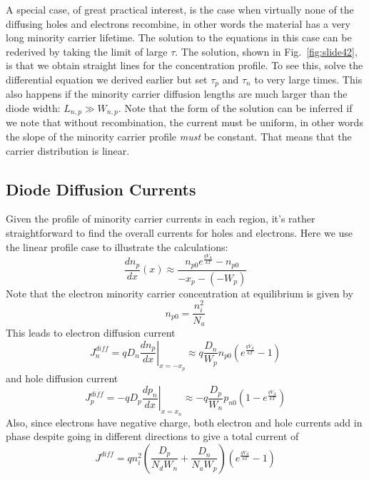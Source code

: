 A special case, of great practical interest, is the case when virtually none of the diffusing holes and electrons recombine, in other words the material has a very long minority carrier lifetime.  The solution to the equations in this case can be rederived by taking the limit of large $\tau$.  The solution, shown in Fig.~\ref{fig:slide42}, is that we obtain straight lines for the concentration profile.
To see this, solve the differential equation we derived earlier but set $\tau_p$ and $\tau_n$ to very large times.  This also happens if the minority carrier diffusion lengths are much larger than the diode width: $ {L_{n,p}} \gg {W_{n,p}} $.  Note that the form of the solution can be inferred if we note that without recombination, the current must be uniform, in other words the slope of the minority carrier profile \emph{must} be constant. That means that the carrier distribution is linear.
\subsection{Diode Diffusion Currents}
Given the profile of minority carrier currents in each region, it's rather straightforward to find the overall currents for holes and electrons.  Here we use the linear profile case to illustrate the calculations:
    \begin{equation}
        \frac{{d{n_p}}}{{dx}}(x) \approx \frac{{{n_{p0}}{e^{\frac{{q{V_A}}}{{kT}}}} - {n_{p0}}}}{{ - {x_p} - ( - {W_p})}}
    \end{equation}
Note that the electron minority carrier concentration at equilibrium is given by
    \begin{equation}
        {n_{p0}} = \frac{{n_i^2}}{{{N_a}}}
    \end{equation}
This leads to electron diffusion current
    \begin{equation}
        J_n^{diff} = q{D_n}{\left. {\frac{{d{n_p}}}{{dx}}} \right|_{x =  - {x_p}}} \approx q\frac{{{D_n}}}{{{W_p}}}{n_{p0}}\left( {{e^{\frac{{q{V_A}}}{{kT}}}} - 1} \right)
    \end{equation}
and hole diffusion current
    \begin{equation}
        J_p^{diff} =  - q{D_p}{\left. {\frac{{d{p_n}}}{{dx}}} \right|_{x = {x_n}}} \approx  - q\frac{{{D_p}}}{{{W_n}}}{p_{n0}}\left( {1 - {e^{\frac{{q{V_A}}}{{kT}}}}} \right)
    \end{equation}
Also, since electrons have negative charge, both electron and hole currents add in phase despite going in different directions to give a total current of
    \begin{equation}
        J_{}^{diff} = qn_i^2\left( {\frac{{{D_p}}}{{{N_d}{W_n}}} + \frac{{{D_n}}}{{{N_a}{W_p}}}} \right)\left( {{e^{\frac{{q{V_A}}}{{kT}}}} - 1} \right)
    \end{equation}
